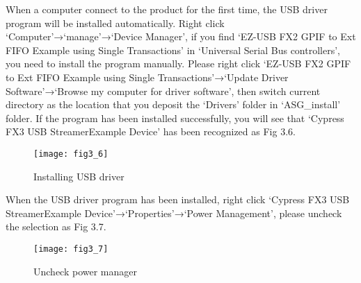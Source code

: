 \hspace{-0.2cm}When a computer connect to the product for the first time, the USB driver program will be installed automatically. Right click `Computer'→`manage'→`Device Manager', if you find `EZ-USB FX2 GPIF to Ext FIFO Example using Single Transactions' in `Universal Serial Bus controllers', you need to install the program manually. Please right click `EZ-USB FX2 GPIF to Ext FIFO Example using Single Transactions'→`Update Driver Software'→`Browse my computer for driver software', then switch current directory as the location that you deposit the `Drivers' folder in `ASG\_install' folder. If the program has been installed successfully, you will see that `Cypress FX3 USB StreamerExample Device' has been recognized as Fig 3.6.
\begin{figure}[htbp]
\centering
\texttt{[image: fig3\_6]}
\caption{\hspace{0.2cm}Installing USB driver}
\end{figure}

\hspace{-0.2cm}When the USB driver program has been installed, right click `Cypress FX3 USB StreamerExample Device'→`Properties'→`Power Management', please uncheck the selection as Fig 3.7.
\begin{figure}[htbp]
\centering
\texttt{[image: fig3\_7]}
\caption{\hspace{0.2cm}Uncheck power manager}
\end{figure}

